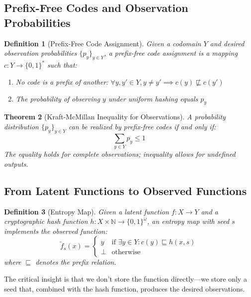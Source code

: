 \documentclass[11pt,final,hidelinks]{article}
\newtheorem{theorem}{Theorem}[section]
\newtheorem{definition}[theorem]{Definition}
\newcommand{\obs}[1]{\widetilde{#1}}  %
\begin{document}
\subsection{Prefix-Free Codes and Observation Probabilities}

\begin{definition}[Prefix-Free Code Assignment]
Given a codomain $Y$ and desired observation probabilities $\{p_y\}_{y \in Y}$, a prefix-free code assignment is a mapping $c: Y \to \{0,1\}^*$ such that:
\begin{enumerate}
    \item No code is a prefix of another: $\forall y, y' \in Y, y \neq y' \implies c(y) \not\sqsubseteq c(y')$
    \item The probability of observing $y$ under uniform hashing equals $p_y$
\end{enumerate}
\end{definition}

\begin{theorem}[Kraft-McMillan Inequality for Observations]
A probability distribution $\{p_y\}_{y \in Y}$ can be realized by prefix-free codes if and only if:
\begin{equation}
\sum_{y \in Y} p_y \leq 1
\end{equation}
The equality holds for complete observations; inequality allows for undefined outputs.
\end{theorem}

\subsection{From Latent Functions to Observed Functions}

\begin{definition}[Entropy Map]
Given a latent function $f: X \to Y$ and a cryptographic hash function $h: X \times \mathbb{N} \to \{0,1\}^\omega$, an entropy map with seed $s$ implements the observed function:
\begin{equation}
\obs{f}_s(x) = \begin{cases}
y & \text{if } \exists y \in Y: c(y) \sqsubseteq h(x, s) \\
\bot & \text{otherwise}
\end{cases}
\end{equation}
where $\sqsubseteq$ denotes the prefix relation.
\end{definition}

The critical insight is that we don't store the function directly—we store only a seed that, combined with the hash function, produces the desired observations.
\end{document}
